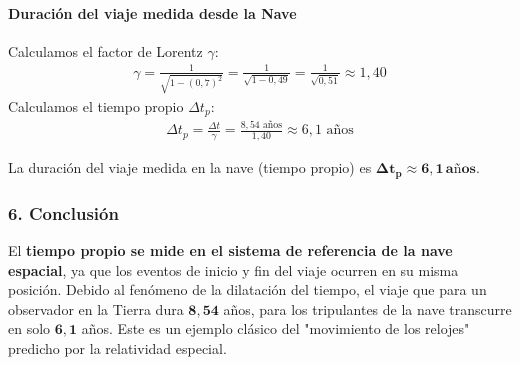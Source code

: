 \paragraph*{Duración del viaje medida desde la Nave}
Calculamos el factor de Lorentz $\gamma$:
\begin{gather}
    \gamma = \frac{1}{\sqrt{1 - (0,7)^2}} = \frac{1}{\sqrt{1 - 0,49}} = \frac{1}{\sqrt{0,51}} \approx 1,40
\end{gather}
Calculamos el tiempo propio $\Delta t_p$:
\begin{gather}
    \Delta t_p = \frac{\Delta t}{\gamma} = \frac{8,54 \text{ años}}{1,40} \approx 6,1 \text{ años}
\end{gather}
\begin{cajaresultado}
La duración del viaje medida en la nave (tiempo propio) es $\boldsymbol{\Delta t_p \approx 6,1 \, \textbf{años}}$.
\end{cajaresultado}

\subsubsection*{6. Conclusión}
\begin{cajaconclusion}
El \textbf{tiempo propio se mide en el sistema de referencia de la nave espacial}, ya que los eventos de inicio y fin del viaje ocurren en su misma posición. Debido al fenómeno de la dilatación del tiempo, el viaje que para un observador en la Tierra dura $\mathbf{8,54}$ años, para los tripulantes de la nave transcurre en solo $\mathbf{6,1}$ años. Este es un ejemplo clásico del "movimiento de los relojes" predicho por la relatividad especial.
\end{cajaconclusion}